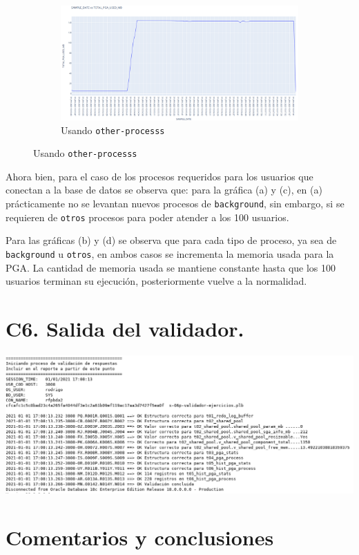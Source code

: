 \documentclass{article}
\begin{document}
\begin{figure}[ht!]
  \begin{subfigure}{0.5\textwidth}
    \centering  
    \includegraphics[width=0.9\linewidth]{t06-grafica02-other}
    \caption{Usando \texttt{other-processs}}
  \end{subfigure} 
\end{figure}

Ahora bien, para el caso de los procesos requeridos para los usuarios que
conectan a la base de datos se observa que: para la gráfica (a) y (c), en (a)
prácticamente no se levantan nuevos procesos de \texttt{background}, sin
embargo, si se requieren de \texttt{otros} procesos para poder atender a los 100
usuarios.

Para las gráficas (b) y (d) se observa que para cada tipo de proceso, ya sea de
\texttt{background} u \texttt{otros}, en ambos casos se incrementa la memoria
usada para la PGA. La cantidad de memoria usada se mantiene constante hasta que
los 100 usuarios terminan su ejecución, posteriormente vuelve a la normalidad.

\section*{C6. Salida del validador.}

\includegraphics[width=\linewidth]{bda-t04-ep03-validador}

\section*{Comentarios y conclusiones}
\end{document}
